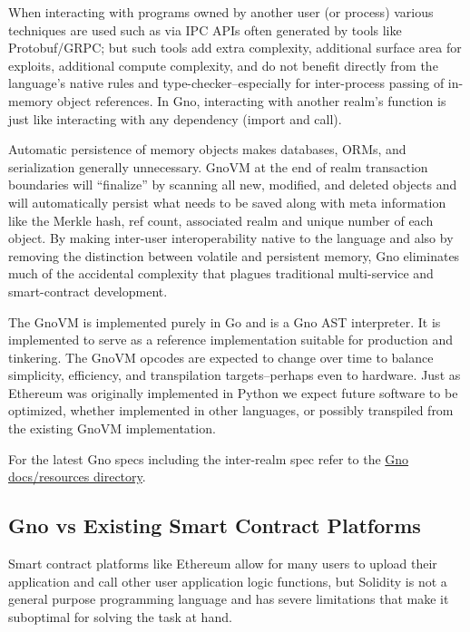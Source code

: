 \documentclass[12pt,a4paper]{article}
\begin{document}
When interacting with programs owned by another user (or process)
various techniques are used such as via IPC APIs often generated by
tools like Protobuf/GRPC; but such tools add extra complexity,
additional surface area for exploits, additional compute complexity, and
do not benefit directly from the language's native rules and
type-checker--especially for inter-process passing of in-memory object
references. In Gno, interacting with another realm's function is just
like interacting with any dependency (import and call).

Automatic persistence of memory objects makes databases, ORMs, and
serialization generally unnecessary. GnoVM at the end of realm
transaction boundaries will ``finalize'' by scanning all new, modified,
and deleted objects and will automatically persist what needs to be
saved along with meta information like the Merkle hash, ref count,
associated realm and unique number of each object. By making inter-user
interoperability native to the language and also by removing the
distinction between volatile and persistent memory, Gno eliminates much
of the accidental complexity that plagues traditional multi-service and
smart-contract development.

The GnoVM is implemented purely in Go and is a Gno AST interpreter. It
is implemented to serve as a reference implementation suitable for
production and tinkering. The GnoVM opcodes are expected to change over
time to balance simplicity, efficiency, and transpilation
targets--perhaps even to hardware. Just as Ethereum was originally
implemented in Python we expect future software to be optimized, whether
implemented in other languages, or possibly transpiled from the existing
GnoVM implementation.

For the latest Gno specs including the inter-realm spec refer to the
\href{https://github.com/gnolang/gno/tree/master/docs/resources}{Gno
docs/resources directory}.

\subsection{Gno vs Existing Smart Contract
Platforms}\label{gno-vs-existing-smart-contract-platforms}

Smart contract platforms like Ethereum allow for many users to upload
their application and call other user application logic functions, but
Solidity is not a general purpose programming language and has severe
limitations that make it suboptimal for solving the task at hand.
\end{document}
